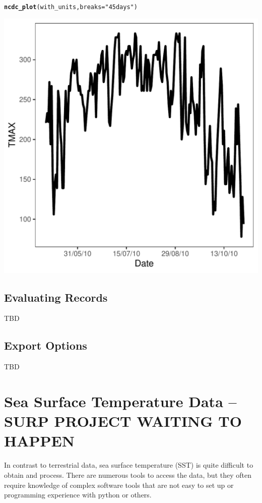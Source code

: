 \documentclass{article}\usepackage[]{graphicx}\usepackage[]{color}
\makeatletter
\def\maxwidth{ %
  \ifdim\Gin@nat@width>\linewidth
    \linewidth
  \else
    \Gin@nat@width
  \fi
}
\newcommand{\hlstr}[1]{\textcolor[rgb]{0.192,0.494,0.8}{#1}}%
\newcommand{\hlstd}[1]{\textcolor[rgb]{0.345,0.345,0.345}{#1}}%
\newcommand{\hlkwc}[1]{\textcolor[rgb]{0.333,0.667,0.333}{#1}}%
\newcommand{\hlkwd}[1]{\textcolor[rgb]{0.737,0.353,0.396}{\textbf{#1}}}%
\newenvironment{kframe}{%
 \def\at@end@of@kframe{}%
 \ifinner\ifhmode%
  \def\at@end@of@kframe{\end{minipage}}%
  \begin{minipage}{\columnwidth}%
 \fi\fi%
 \def\FrameCommand##1{\hskip\@totalleftmargin \hskip-\fboxsep
 \colorbox{shadecolor}{##1}\hskip-\fboxsep
     \hskip-\linewidth \hskip-\@totalleftmargin \hskip\columnwidth}%
 \MakeFramed {\advance\hsize-\width
   \@totalleftmargin\z@ \linewidth\hsize
   \@setminipage}}%
 {\par\unskip\endMakeFramed%
 \at@end@of@kframe}
\newenvironment{knitrout}{}{} %
\makeatother
\begin{document}
\begin{knitrout}
\color{fgcolor}\begin{kframe}
\begin{alltt}
\hlkwd{ncdc_plot}\hlstd{(with_units,} \hlkwc{breaks}\hlstd{=}\hlstr{"45 days"}\hlstd{)}
\end{alltt}
\end{kframe}
\includegraphics[width=\maxwidth]{figure/unnamed-chunk-8-1} 
\end{knitrout}
\subsection{Evaluating Records}

TBD

\subsection{Export Options}

TBD

\section{Sea Surface Temperature Data -- SURP PROJECT WAITING TO HAPPEN}

In contrast to terrestrial data, sea surface temperature (SST) is quite difficult to obtain and process. There are numerous tools to access the data, but they often require knowledge of complex software tools that are not easy to set up or programming experience with python or others.
\end{document}
